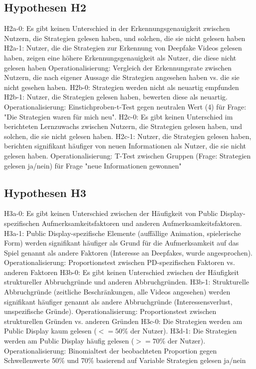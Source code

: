 \subsection{Hypothesen H2}
H2a-0: Es gibt keinen Unterschied in der Erkennungsgenauigkeit zwischen Nutzern, die Strategien gelesen haben, und solchen, die sie nicht gelesen haben
H2a-1: Nutzer, die die Strategien zur Erkennung von Deepfake Videos gelesen haben, zeigen eine höhere Erkennungsgenauigkeit als Nutzer, die diese nicht gelesen haben
Operationalisierung: Vergleich der Erkennungsrate zwischen Nutzern, die nach eigener Aussage die Strategien angesehen haben vs. die sie nicht gesehen haben.
H2b-0: Strategien werden nicht als neuartig empfunden
H2b-1: Nutzer, die Strategien gelesen haben, bewerten diese als neuartig.
Operationalisierung: Einstichproben-t-Test gegen neutralen Wert (4) für Frage: "Die Strategien waren für mich neu".
H2c-0: Es gibt keinen Unterschied im berichteten Lernzuwachs zwischen Nutzern, die Strategien gelesen haben, und solchen, die sie nicht gelesen haben.
H2c-1: Nutzer, die Strategien gelesen haben, berichten signifikant häufiger von neuen Informationen als Nutzer, die sie nicht gelesen haben.
Operationalisierung: T-Test zwischen Gruppen (Frage: Strategien gelesen ja/nein) für Frage "neue Informationen gewonnen"
\subsection{Hypothesen H3}
H3a-0: Es gibt keinen Unterschied zwischen der Häufigkeit von Public Display-spezifischen Aufmerksamkeitsfaktoren und anderen Aufmerksamkeitsfaktoren.
H3a-1: Public Display-spezifische Elemente (auffällige Animation, spielerische Form) werden signifikant häufiger 
als Grund für die Aufmerksamkeit auf das Spiel genannt als andere Faktoren (Interesse an Deepfakes, wurde angesprochen). 
Operationalisierung: Proportionstest zwischen PD-spezifischen Faktoren vs. anderen Faktoren
H3b-0: Es gibt keinen Unterschied zwischen der Häufigkeit struktureller Abbruchgründe und anderen Abbruchgründen.
H3b-1: Strukturelle Abbruchgründe (zeitliche Beschränkungen, alle Videos angesehen) werden signifikant häufiger genannt als andere Abbruchgründe (Interessensverlust, unspezifische Gründe).
Operationalisierung: Proportionstest zwischen strukturellen Gründen vs. anderen Gründen
H3c-0: Die Strategien werden am Public Display kaum gelesen ($<=50\%$ der Nutzer).
H3d-1: Die Strategien werden am Public Display häufig gelesen ($>=70\%$ der Nutzer).
Operationalisierung: Binomialtest der beobachteten Proportion gegen Schwellenwerte 50\% und 70\% basierend auf Variable Strategien gelesen ja/nein
